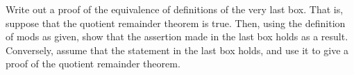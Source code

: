 Write out a proof of the equivalence of definitions of the very last box. That is, suppose that the quotient remainder theorem is true. Then, using the definition of mods as given, show that the assertion made in the last box holds as a result. Conversely, assume that the statement in the last box holds, and use it to give a proof of the quotient remainder theorem.